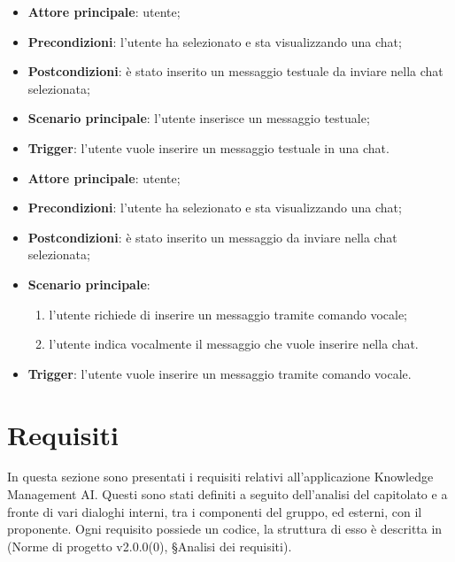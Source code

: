 \documentclass[10pt, a4paper]{article}
\begin{document}
    \begin{itemize}
        \item \textbf{Attore principale}: utente;
        \item \textbf{Precondizioni}: l’utente ha selezionato e sta visualizzando una chat;
        \item \textbf{Postcondizioni}: è stato inserito un messaggio testuale da inviare nella chat selezionata;
        \item \textbf{Scenario principale}: l’utente inserisce un messaggio testuale;
        \item \textbf{Trigger}: l’utente vuole inserire un messaggio testuale in una chat.
    \end{itemize}
    
    \begin{itemize}
        \item \textbf{Attore principale}: utente;
        \item \textbf{Precondizioni}: l’utente ha selezionato e sta visualizzando una chat;
        \item \textbf{Postcondizioni}: è stato inserito un messaggio da inviare nella chat selezionata;
        \item \textbf{Scenario principale}:
            \begin{enumerate}
                \item l’utente richiede di inserire un messaggio tramite comando vocale;
                \item l’utente indica vocalmente il messaggio che vuole inserire nella chat.
            \end{enumerate}
        \item \textbf{Trigger}: l’utente vuole inserire un messaggio tramite comando vocale.
    \end{itemize}


\newpage
\section{Requisiti}
In questa sezione sono presentati i requisiti relativi all’applicazione Knowledge Management AI. Questi sono stati definiti a seguito dell’analisi del capitolato e a fronte di vari dialoghi interni, tra i componenti del gruppo, ed esterni, con il proponente. Ogni requisito possiede un codice, la struttura di esso è descritta in (Norme di progetto v2.0.0(0), \S Analisi dei requisiti).
\end{document}
